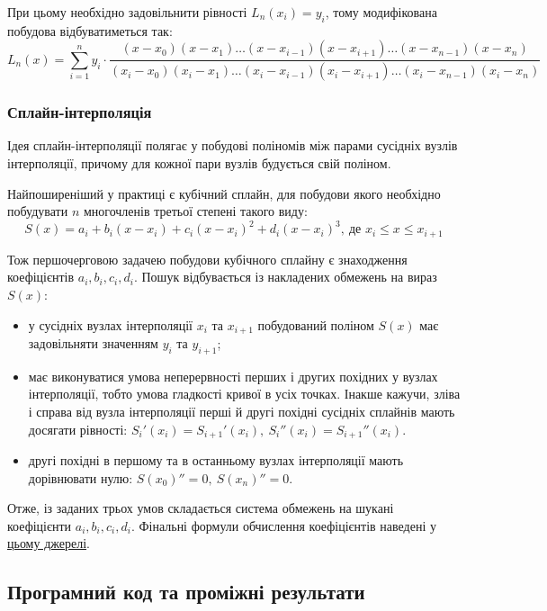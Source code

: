 \documentclass[a4paper,14pt]{extarticle} %
\begin{document}
При цьому необхідно задовільнити рівності $L_n(x_i)=y_i$, тому модифікована побудова відбуватиметься так:
\[ L_n(x)=\sum\limits_{i=1}^{n}y_i\cdot\frac{(x-x_0)(x-x_1)\ldots (x-x_{i-1})(x-x_{i+1})\ldots (x-x_{n-1})(x-x_n)}{(x_i-x_0)(x_i-x_1)\ldots (x_i-x_{i-1})(x_i-x_{i+1})\ldots (x_i-x_{n-1})(x_i-x_n)} \]

\subsubsection*{Сплайн-інтерполяція}

Ідея сплайн-інтерполяції полягає у побудові поліномів між парами сусідніх вузлів інтерполяції, причому для 
кожної пари вузлів будується свій поліном. 

Найпоширеніший у практиці є кубічний сплайн, для побудови якого 
необхідно побудувати $n$ многочленів третьої степені такого виду:
\[ S(x)=a_i+b_i(x-x_{i})+c_i(x-x_i)^2+d_i(x-x_i)^3,\ \text{де } x_i\leqslant x\leqslant x_{i+1}\]

Тож першочерговою задачею побудови кубічного сплайну є знаходження коефіцієнтів $a_i,b_i,c_i,d_i$. Пошук відбувається 
із накладених обмежень на вираз $S(x)$:
\begin{itemize}
    \item у сусідніх вузлах інтерполяції $x_i$ та $x_{i+1}$ побудований поліном $S(x)$ має задовільняти 
    значенням $y_i$ та $y_{i+1}$;
    \item має виконуватися умова неперервності перших і других похідних у вузлах інтерполяції, тобто умова 
    гладкості кривої в усіх точках. Інакше кажучи, зліва і справа від вузла інтерполяції перші й другі похідні 
    сусідніх сплайнів мають досягати рівності: $S_i'(x_i)=S_{i+1}'(x_i),\ S_i''(x_i)=S_{i+1}''(x_i)$.
    \item другі похідні в першому та в останньому вузлах інтерполяції мають дорівнювати нулю: $S(x_0)''=0,\ S(x_n)''=0$.
\end{itemize}

Отже, із заданих трьох умов складається система обмежень на шукані коефіцієнти $a_i,b_i,c_i,d_i$. Фінальні формули 
обчислення коефіцієнтів наведені у 
\href{https://www.mathros.net.ua/znahodzhennja-nablyzhenogo-znachennja-tablychno-zadanoi-funkcii-vykorystovujuchy-kubichnu-splajn-interpoljaciju.html}{цьому джерелі}. 

\subsection*{Програмний код та проміжні результати}
\end{document}

